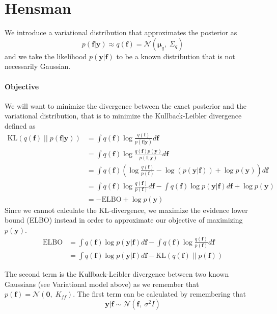 \documentclass[5p,11pt]{article}
\begin{document}
\newpage
\section{Hensman}
We introduce a variational distribution that approximates the posterior as
$$ p(\bm{f}|\bm{y}) \approx q(\bm{f}) = \mathcal{N}(\bm{\mu}_q,\; \Sigma_q) $$
and we take the likelihood $p(\bm{y}|\bm{f})$ to be a known distribution that is not necessarily Gaussian.

\paragraph{Objective} We will want to minimize the divergence between the exact posterior and the variational distribution, that is to minimize the Kullback-Leibler divergence defined as
\begin{equation}
    \begin{aligned}
\mathrm{KL}(q(\bm{f})\;||\;p(\bm{f}|\bm{y})) &= \int q(\bm{f}) \log \frac{q(\bm{f})}{p(\bm{f}|\bm{y})} d\bm{f}\\
&= \int q(\bm{f}) \log \frac{q(\bm{f})p(\bm{y})}{p(\bm{f},\bm{y})} d\bm{f}\\
&= \int q(\bm{f}) \left( \log \frac{q(\bm{f})}{p(\bm{f})} - \log (p(\bm{y}|\bm{f})) + \log p(\bm{y})\right) d\bm{f}\\
&= \int q(\bm{f}) \log \frac{q(\bm{f})}{p(\bm{f})} d\bm{f} - \int q(\bm{f}) \log p(\bm{y}|\bm{f}) d\bm{f} + \log p(\bm{y})\\
&= -\mathrm{ELBO} + \log p(\bm{y})
    \end{aligned}
\end{equation}
Since we cannot calculate the KL-divergence, we maximize the evidence lower bound (ELBO) instead in order to approximate our objective of maximizing $p(\bm{y})$. 
\begin{equation}
\label{eq:variational_elbo}
    \begin{aligned}
    \mathrm{ELBO} &= \int q(\bm{f}) \log p(\bm{y}|\bm{f}) d\bm{f} -\int q(\bm{f}) \log \frac{q(\bm{f})}{p(\bm{f})} d\bm{f}\\
    &= \int q(\bm{f}) \log p(\bm{y}|\bm{f}) d\bm{f} - \mathrm{KL}(q(\bm{f})\;||\;p(\bm{f}))
    \end{aligned}
\end{equation}

The second term is the Kullback-Leibler divergence between two known Gaussians (see Variational model above) as we remember that $p(\bm{f}) = \mathcal{N}(\bm{0},\; K_{ff})$. The first term can be calculated by remembering that
$$ \bm{y}|\bm{f} \sim \mathcal{N}(\bm{f},\; \sigma^2I) $$
\end{document}

